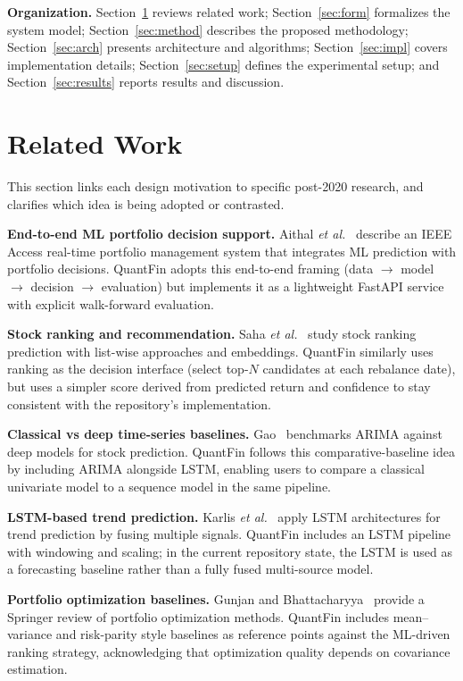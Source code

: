 \documentclass[conference]{IEEEtran}
\begin{document}
\textbf{Organization.} Section~\ref{sec:rw} reviews related work; Section~\ref{sec:form} formalizes the system model; Section~\ref{sec:method} describes the proposed methodology; Section~\ref{sec:arch} presents architecture and algorithms; Section~\ref{sec:impl} covers implementation details; Section~\ref{sec:setup} defines the experimental setup; and Section~\ref{sec:results} reports results and discussion.

\section{Related Work}\label{sec:rw}
This section links each design motivation to specific post-2020 research, and clarifies which idea is being adopted or contrasted.

\textbf{End-to-end ML portfolio decision support.} Aithal \emph{et al.}~\cite{aithal2023realtime} describe an IEEE Access real-time portfolio management system that integrates ML prediction with portfolio decisions. QuantFin adopts this end-to-end framing (data $\rightarrow$ model $\rightarrow$ decision $\rightarrow$ evaluation) but implements it as a lightweight FastAPI service with explicit walk-forward evaluation.

\textbf{Stock ranking and recommendation.} Saha \emph{et al.}~\cite{saha2021stockranking} study stock ranking prediction with list-wise approaches and embeddings. QuantFin similarly uses ranking as the decision interface (select top-$N$ candidates at each rebalance date), but uses a simpler score derived from predicted return and confidence to stay consistent with the repository's implementation.

\textbf{Classical vs deep time-series baselines.} Gao~\cite{gao2021arimadeep} benchmarks ARIMA against deep models for stock prediction. QuantFin follows this comparative-baseline idea by including ARIMA alongside LSTM, enabling users to compare a classical univariate model to a sequence model in the same pipeline.

\textbf{LSTM-based trend prediction.} Karlis \emph{et al.}~\cite{karlis2021lstmfusion} apply LSTM architectures for trend prediction by fusing multiple signals. QuantFin includes an LSTM pipeline with windowing and scaling; in the current repository state, the LSTM is used as a forecasting baseline rather than a fully fused multi-source model.

\textbf{Portfolio optimization baselines.} Gunjan and Bhattacharyya~\cite{gunjan2022portfolioreview} provide a Springer review of portfolio optimization methods. QuantFin includes mean--variance and risk-parity style baselines as reference points against the ML-driven ranking strategy, acknowledging that optimization quality depends on covariance estimation.
\end{document}
